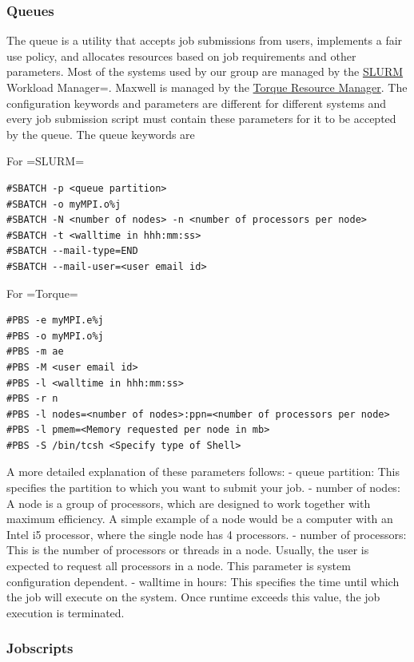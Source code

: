 \documentclass[11pt]{article}
\begin{document}
    \subsubsection{Queues}\label{queues}

The queue is a utility that accepts job submissions from users,
implements a fair use policy, and allocates resources based on job
requirements and other parameters. Most of the systems used by our group
are managed by the \href{http://slurm.schedmd.com/}{SLURM} Workload
Manager=. Maxwell is managed by the
\href{http://www.adaptivecomputing.com/products/open-source/torque/}{Torque
Resource Manager}. The configuration keywords and parameters are
different for different systems and every job submission script must
contain these parameters for it to be accepted by the queue. The queue
keywords are

    For =SLURM=

\begin{verbatim}
#SBATCH -p <queue partition>
#SBATCH -o myMPI.o%j
#SBATCH -N <number of nodes> -n <number of processors per node>
#SBATCH -t <walltime in hhh:mm:ss>
#SBATCH --mail-type=END
#SBATCH --mail-user=<user email id>
\end{verbatim}

For =Torque=

\begin{verbatim}
#PBS -e myMPI.e%j
#PBS -o myMPI.o%j
#PBS -m ae
#PBS -M <user email id> 
#PBS -l <walltime in hhh:mm:ss>
#PBS -r n
#PBS -l nodes=<number of nodes>:ppn=<number of processors per node>
#PBS -l pmem=<Memory requested per node in mb>
#PBS -S /bin/tcsh <Specify type of Shell>
\end{verbatim}

    A more detailed explanation of these parameters follows: - queue
partition: This specifies the partition to which you want to submit your
job. - number of nodes: A node is a group of processors, which are
designed to work together with maximum efficiency. A simple example of a
node would be a computer with an Intel i5 processor, where the single
node has 4 processors. - number of processors: This is the number of
processors or threads in a node. Usually, the user is expected to
request all processors in a node. This parameter is system configuration
dependent. - walltime in hours: This specifies the time until which the
job will execute on the system. Once runtime exceeds this value, the job
execution is terminated.

    \subsubsection{Jobscripts}\label{jobscripts}
\end{document}
